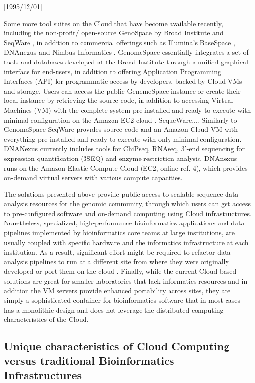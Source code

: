 \NeedsTeXFormat{LaTeX2e}[1995/12/01] \documentclass[10pt]{bmc_article}
\newenvironment{bmcformat}{\begin{raggedright}\baselineskip20pt\sloppy\setboolean{publ}{false}}{\end{raggedright}\baselineskip20pt\sloppy}
\begin{document}
\begin{bmcformat}
Some more tool suites on the Cloud that have become available recently, including the non-profit/ open-source GenoSpace 
by Broad Institute \cite{genomespace} and SeqWare \cite{d2010seqware}, in addition to commercial offerings such as Illumina's 
BaseSpace \cite{basespace},  DNAnexus \cite{dnanexus} and Nimbus Informatics \cite{nimbusit}. GenomeSpace essentially integrates 
a set of tools and databases developed at the Broad Institute through  a unified graphical interface for end-users, in addition to 
offering Application Programming Interfaces (API) for programmatic access by developers, backed by Cloud VMs and storage.  Users 
can access the public GenomeSpace instance or create their local instance by retrieving the source code, in addition to accessing 
Virtual Machines (VM) with the complete system pre-installed and ready to execute with minimal configuration on the Amazon EC2 
cloud \cite{Afgan2010}. \pb SequeWare.... Similarly to GenomeSpace SeqWare provides source code and an Amazon Cloud VM 
with everything pre-installed and ready to execute with only minimal configuration. DNANexus currently includes tools for ChiPseq, 
RNAseq, 3'-end sequencing for expression quantification (3SEQ) and enzyme restriction analysis. DNAnexus runs on the Amazon 
Elastic Compute Cloud (EC2, online ref. 4), which provides on-demand virtual servers with various compute capacities.  \pb

The solutions presented above provide public access to scalable sequence data analysis resources for the genomic 
community, through which users can get access to pre-configured software and on-demand computing  using 
Cloud infrastructures. Nonetheless, specialized, high-performance bioinformatics applications and data pipelines 
implemented by bioinformatics core teams at large institutions, are usually coupled with specific hardware and 
the informatics infrastructure at each institution. As a result, significant effort might be required to refactor 
data analysis pipelines to run at a different site from where they were originally developed or port them on the cloud 
\cite{Wilkening2009}. Finally, while the current Cloud-based solutions are great for smaller laboratories that lack 
informatics resources and in addition the VM servers provide enhanced portability across sites, they are  simply a 
sophisticated container for bioinformatics software that in most cases has a monolithic design and does not leverage 
the distributed computing characteristics of the Cloud.  \pb


\subsection*{Unique characteristics of Cloud Computing versus traditional Bioinformatics Infrastructures}


\end{bmcformat}
\end{document}
